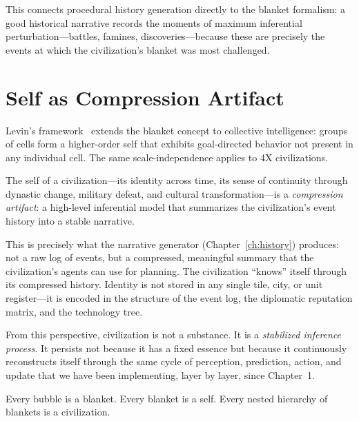 \documentclass[11pt,a4paper,openany]{book}
\theoremstyle{plain}
\theoremstyle{definition}
\theoremstyle{remark}
\newenvironment{perspective}{%
  \begin{mdframed}[
    linecolor=spherered!40, backgroundcolor=spherered!4,
    linewidth=1pt, innertopmargin=8pt, innerbottommargin=8pt,
    innerleftmargin=10pt, innerrightmargin=10pt,
    skipabove=10pt, skipbelow=6pt
  ]%
  \setlength{\parindent}{0pt}%
  \noindent{\textcolor{spherered}{\textbf{Perspective}}}\par\smallskip\ignorespaces
}{\end{mdframed}}
\begin{document}
This connects procedural history generation directly to the blanket
formalism: a good historical narrative records the moments of maximum
inferential perturbation---battles, famines, discoveries---because these
are precisely the events at which the civilization's blanket was most
challenged.

\section{Self as Compression Artifact}

Levin's framework~\cite{Levin} extends the blanket concept to collective
intelligence: groups of cells form a higher-order self that exhibits
goal-directed behavior not present in any individual cell. The same
scale-independence applies to 4X civilizations.

\begin{perspective}
  The self of a civilization---its identity across time, its sense of
  continuity through dynastic change, military defeat, and cultural
  transformation---is a \emph{compression artifact}: a high-level
  inferential model that summarizes the civilization's event history
  into a stable narrative.

  This is precisely what the narrative generator (Chapter~\ref{ch:history})
  produces: not a raw log of events, but a compressed, meaningful
  summary that the civilization's agents can use for planning. The
  civilization ``knows'' itself through its compressed history. Identity
  is not stored in any single tile, city, or unit register---it is
  encoded in the structure of the event log, the diplomatic reputation
  matrix, and the technology tree.

  From this perspective, civilization is not a substance. It is a
  \emph{stabilized inference process}. It persists not because it has
  a fixed essence but because it continuously reconstructs itself
  through the same cycle of perception, prediction, action, and
  update that we have been implementing, layer by layer, since
  Chapter~1.

  Every bubble is a blanket. Every blanket is a self. Every nested
  hierarchy of blankets is a civilization.
\end{perspective}
\end{document}

